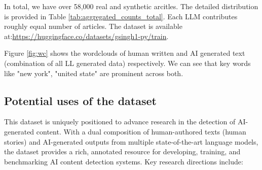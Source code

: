 In total, we have over 58,000 real and synthetic arcitles. The detailed distribution is provided in Table \ref{tab:aggregated_counts_total}. Each LLM contributes roughly equal number of articles.  The dataset is available at:\href{https://huggingface.co/datasets/gsingh1-py/train}{https://huggingface.co/datasets/gsingh1-py/train}.

Figure \ref{fig:wc} shows the wordclouds of human written and AI generated text (combination of all LL generated data) respectively. We can see that key words like "new york", "united state" are prominent across both. 



\subsection{Potential uses of the dataset}
This dataset is uniquely positioned to advance research in the detection of AI-generated content. With a dual composition of human-authored texts (human stories) and AI-generated outputs from multiple state-of-the-art language models, the dataset provides a rich, annotated resource for developing, training, and benchmarking AI content detection systems. Key research directions include:
